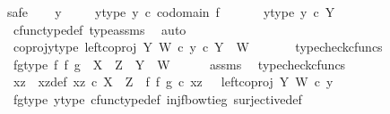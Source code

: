 \begin{isabellebody}
\isamarkupfalse%
{\isacharparenleft}{\kern0pt}safe{\isacharparenright}{\kern0pt}\isanewline
\ \ \isamarkupfalse%
\ y\ \isanewline
\ \ \isamarkupfalse%
\ y{\isacharunderscore}{\kern0pt}type{\isacharcolon}{\kern0pt}\ {\isachardoublequoteopen}y\ {\isasymin}\isactrlsub c\ codomain\ f{\isachardoublequoteclose}\ \isanewline
\ \ \isamarkupfalse%
\ \isamarkupfalse%
\ y{\isacharunderscore}{\kern0pt}type{}{\isacharcolon}{\kern0pt}\ {\isachardoublequoteopen}y\ {\isasymin}\isactrlsub c\ Y{\isachardoublequoteclose}\isanewline
\ \ \ \ \isamarkupfalse%
\ cfunc{\isacharunderscore}{\kern0pt}type{\isacharunderscore}{\kern0pt}def\ type{\isacharunderscore}{\kern0pt}assms{\isacharparenleft}{\kern0pt}{}{\isacharparenright}{\kern0pt}\ \isamarkupfalse%
\ auto\isanewline
\ \ \isamarkupfalse%
\ \isamarkupfalse%
\ coproj{\isacharunderscore}{\kern0pt}y{\isacharunderscore}{\kern0pt}type{\isacharcolon}{\kern0pt}\ {\isachardoublequoteopen}left{\isacharunderscore}{\kern0pt}coproj\ Y\ W\ {\isasymcirc}\isactrlsub c\ y\ {\isasymin}\isactrlsub c\ Y\ {\isasymCoprod}\ W{\isachardoublequoteclose}\ \isanewline
\ \ \ \ \isamarkupfalse%
\ typecheck{\isacharunderscore}{\kern0pt}cfuncs\isanewline
\ \ \isamarkupfalse%
\ fg{\isacharunderscore}{\kern0pt}type{\isacharcolon}{\kern0pt}\ {\isachardoublequoteopen}{\isacharparenleft}{\kern0pt}f\ {\isasymbowtie}\isactrlsub f\ g{\isacharparenright}{\kern0pt}\ {\isacharcolon}{\kern0pt}\ X\ {\isasymCoprod}\ Z\ {\isasymrightarrow}\ Y\ {\isasymCoprod}\ W{\isachardoublequoteclose}\isanewline
\ \ \ \ \isamarkupfalse%
\ assms\ \isamarkupfalse%
\ typecheck{\isacharunderscore}{\kern0pt}cfuncs\isanewline
\ \ \isamarkupfalse%
\ xz\ \ xz{\isacharunderscore}{\kern0pt}def{\isacharcolon}{\kern0pt}\ {\isachardoublequoteopen}xz\ {\isasymin}\isactrlsub c\ X\ {\isasymCoprod}\ Z\ {\isasymand}\ {\isacharparenleft}{\kern0pt}f\ {\isasymbowtie}\isactrlsub f\ g{\isacharparenright}{\kern0pt}\ {\isasymcirc}\isactrlsub c\ xz\ {\isacharequal}{\kern0pt}\ \ left{\isacharunderscore}{\kern0pt}coproj\ Y\ W\ {\isasymcirc}\isactrlsub c\ y{\isachardoublequoteclose}\isanewline
\ \ \ \ \isamarkupfalse%
\ fg{\isacharunderscore}{\kern0pt}type\ y{\isacharunderscore}{\kern0pt}type{}\ cfunc{\isacharunderscore}{\kern0pt}type{\isacharunderscore}{\kern0pt}def\ inj{\isacharunderscore}{\kern0pt}f{\isacharunderscore}{\kern0pt}bowtie{\isacharunderscore}{\kern0pt}g\ surjective{\isacharunderscore}{\kern0pt}def\ \isamarkupfalse%

\end{isabellebody}
